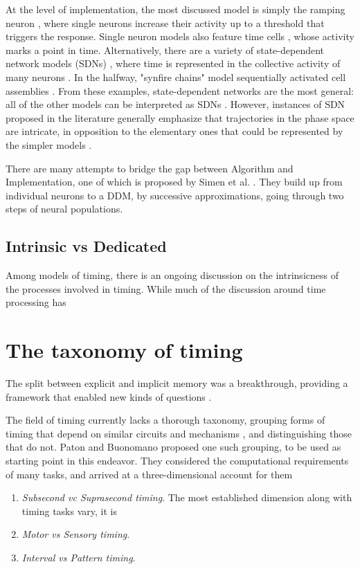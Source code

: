     At the level of implementation, the most discussed model is simply the ramping neuron \cite{}, where single neurons increase their activity up to a threshold that triggers the response. Single neuron models also feature time cells \cite{}, whose activity marks a point in time. Alternatively, there are a variety of state-dependent network models (SDNs) \cite{}, where time is represented in the collective activity of many neurons \cite{}. In the halfway, "synfire chains" model sequentially activated cell assemblies \cite{}. From these examples, state-dependent networks are the most general: all of the other models can be interpreted as SDNs \cite{}. However, instances of SDN proposed in the literature generally emphasize that trajectories in the phase space are intricate, in opposition to the elementary ones that could be represented by the simpler models \cite{}.

    There are many attempts to bridge the gap between Algorithm and Implementation, one of which is proposed by Simen et al. \cite{}. They build up from individual neurons to a DDM, by successive approximations, going through two steps of neural populations.
    
    \subsection{Intrinsic vs Dedicated}
        Among models of timing, there is an ongoing discussion on the intrinsicness of the processes involved in timing. While much of the discussion around time processing has 
        
\section{The taxonomy of timing}
\label{sub:taxonomy}

    The split between explicit and implicit memory was a breakthrough, providing a framework that enabled new kinds of questions \cite{paton2018neural}. %
    
    
    The field of timing currently lacks a thorough taxonomy, grouping forms of timing that depend on similar circuits and mechanisms \cite{}, and distinguishing those that do not. Paton and Buonomano \cite{paton2018neural} proposed one such grouping, to be used as starting point in this endeavor. They considered the computational requirements of many tasks, and arrived at a three-dimensional account for them
    \begin{enumerate}
        \item \textit{Subsecond vc Suprasecond timing}. The most established dimension along with timing tasks vary, it is
        \item \textit{Motor vs Sensory timing}.
        \item \textit{Interval vs Pattern timing}.
    \end{enumerate}



